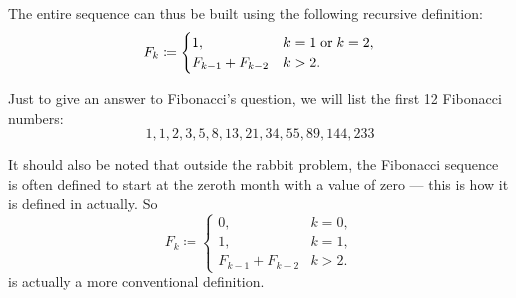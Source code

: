 \begin{example}
  The entire sequence can thus be built using the following recursive definition:
  \begin{equation*}
    F_k \coloneqq \begin{cases}
      1,                &k = 1 \T{or} k = 2, \\
      F_{k-1} + F_{k-2} &k > 2.
    \end{cases}
  \end{equation*}

  Just to give an answer to Fibonacci's question, we will list the first 12 Fibonacci numbers:
  \begin{equation*}
    1, 1, 2, 3, 5, 8, 13, 21, 34, 55, 89, 144, 233
  \end{equation*}

  It should also be noted that outside the rabbit problem, the Fibonacci sequence is often defined to start at the zeroth month with a value of zero --- this is how it is defined in  actually. So
  \begin{equation}\label{eq:ex:fibonacci_rabbits}
    F_k \coloneqq \begin{cases}
      0,                &k = 0, \\
      1,                &k = 1, \\
      F_{k-1} + F_{k-2} &k > 2.
    \end{cases}
  \end{equation}
  is actually a more conventional definition.
\end{example}

